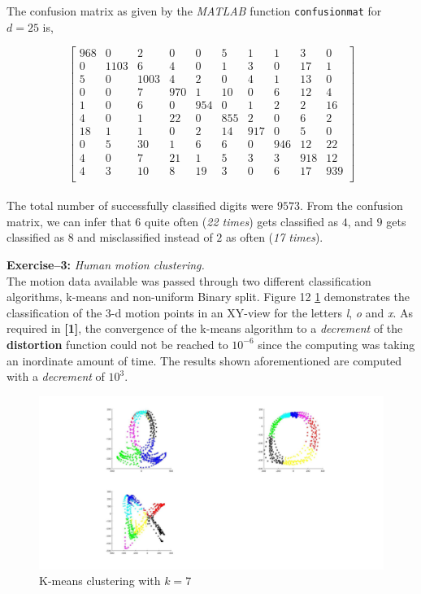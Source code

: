 \documentclass[10pt,a4paper]{report}
\begin{document}
The confusion matrix as given by the \emph{MATLAB} function \texttt{confusionmat} for $\textbf{$d$}=25$ is,

\[\left[ \begin{array}{cccccccccc}
968 &	0 &	2 &	0 &	0 &	5 &	1 &	1 &	3 &	0\\
0 &	1103 &	6 &	 4 &	0 &	1 &	3 &	0 &	17 &	1\\
5 &	0 &	1003 &	4 &	2 &	0 &	4 &	1 &	13 &	0\\
0 &	0 &	7 &	970 &	1 &	10 &	0 &	6 &	12 &	4\\
1 &	0 &	6 &	0 &	954 &	0 &	1 &	2 &	2 &	16\\
4 &	0 &	1 &	22 &	0 &	855 &	2 &	0 &	6 &	2\\
18 &	1 &	1 &	0 &	2 &	14 &	917 &	0 &	5 &	0\\
0 &	5 &	30 &	1 &	6 &	6 &	0 &	946 &	12 &	22\\
4 &	0 &	7 &	21 &	1 &	5 &	3 &	3 &	918 &	12\\
4 &	3 &	10 &	8 &	19 &	3 &	0 &	6 &	17 &	939\\
\end{array} \right]\]
\\
The total number of successfully classified digits were $9573$. From the confusion matrix, we can infer that $6$ quite often (\textit{22 times}) gets classified as $4$, and $9$ gets classified as $8$ and misclassified instead of $2$ as often (\textit{17 times}).

\clearpage
\textbf{Exercise--3:}
\textit{Human motion clustering.}\\
The motion data available was passed through two different classification algorithms, k-means and non-uniform Binary split. Figure 12 \ref{fig:fig_12} demonstrates the classification of the 3-d motion points in an XY-view for the letters \emph{l}, \emph{o} and \emph{x}. As required in \textbf{[1]}, the convergence of the k-means algorithm to a \emph{decrement} of the \textbf{distortion} function could not be reached to $10^{-6}$ since the computing was taking an inordinate amount of time. The results shown aforementioned are computed with a \emph{decrement} of $10^3$. 
\begin{figure}[!ht]
	\graphicspath{{./Exercise3/}}
	\centering
	\includegraphics[scale=0.15]{k_means}	
	
	\begin{flushleft}
	\caption{K-means clustering with $k=7$}
	\end{flushleft}
	\label{fig:fig_12}
	
\end{figure}
\end{document}
